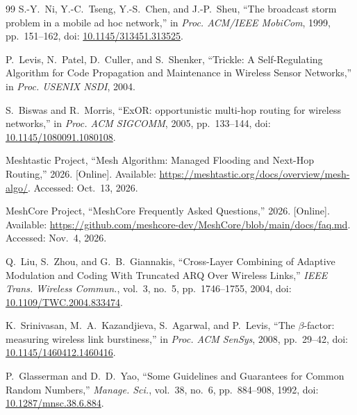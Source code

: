 \documentclass[conference,letterpaper,10pt]{IEEEtran}
\begin{document}
\begin{thebibliography}{99}
S.-Y.~Ni, Y.-C.~Tseng, Y.-S.~Chen, and J.-P.~Sheu,
``The broadcast storm problem in a mobile ad hoc network,''
in \emph{Proc. ACM/IEEE MobiCom}, 1999, pp.~151--162,
doi: \url{10.1145/313451.313525}.

P.~Levis, N.~Patel, D.~Culler, and S.~Shenker,
``Trickle: A Self-Regulating Algorithm for Code Propagation and Maintenance in Wireless Sensor Networks,''
in \emph{Proc. USENIX NSDI}, 2004.

S.~Biswas and R.~Morris,
``ExOR: opportunistic multi-hop routing for wireless networks,''
in \emph{Proc. ACM SIGCOMM}, 2005, pp.~133--144,
doi: \url{10.1145/1080091.1080108}.

Meshtastic Project,
``Mesh Algorithm: Managed Flooding and Next-Hop Routing,''
2026. [Online]. Available:
\url{https://meshtastic.org/docs/overview/mesh-algo/}.
Accessed: Oct.~13, 2026.

MeshCore Project,
``MeshCore Frequently Asked Questions,''
2026. [Online]. Available:
\url{https://github.com/meshcore-dev/MeshCore/blob/main/docs/faq.md}.
Accessed: Nov.~4, 2026.

Q.~Liu, S.~Zhou, and G.~B.~Giannakis,
``Cross-Layer Combining of Adaptive Modulation and Coding With Truncated ARQ Over Wireless Links,''
\emph{IEEE Trans. Wireless Commun.}, vol.~3, no.~5, pp.~1746--1755, 2004,
doi: \url{10.1109/TWC.2004.833474}.

K.~Srinivasan, M.~A.~Kazandjieva, S.~Agarwal, and P.~Levis,
``The $\beta$-factor: measuring wireless link burstiness,''
in \emph{Proc. ACM SenSys}, 2008, pp.~29--42,
doi: \url{10.1145/1460412.1460416}.

P.~Glasserman and D.~D.~Yao,
``Some Guidelines and Guarantees for Common Random Numbers,''
\emph{Manage. Sci.}, vol.~38, no.~6, pp.~884--908, 1992,
doi: \url{10.1287/mnsc.38.6.884}.

\end{thebibliography}
\end{document}
